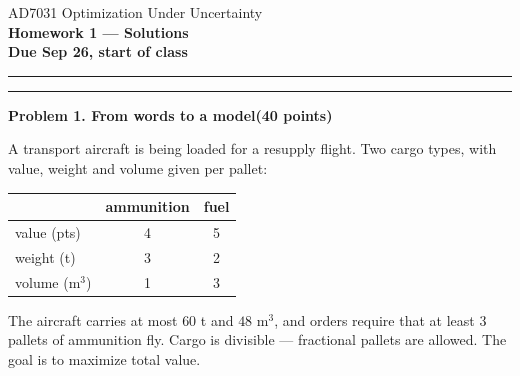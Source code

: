\documentclass[10pt]{article}
\newcommand{\problem}[2]{%
  \par\bigskip
  {\color{ruleink}\rule{\textwidth}{1pt}}\par\nobreak\vspace{3pt}
  {\large\bfseries #2}\hfill{\normalsize\bfseries(#1 points)}\par\nobreak\vspace{4pt}}
\begin{document}
\begin{center}
  {\large AD7031 Optimization Under Uncertainty}\\[3pt]
  {\Large\bfseries Homework 1 --- Solutions}\\[4pt]
  {\small \textbf{Due Sep 26, start of class}}
\end{center}
\medskip\hrule\medskip

\problem{40}{Problem 1. From words to a model}

A transport aircraft is being loaded for a resupply flight. Two cargo types, with value,
weight and volume given per pallet:

\begin{center}
\begin{tabular}{l|cc}
              & ammunition & fuel \\ \hline
 value (pts)  & 4 & 5 \\
 weight (t)   & 3 & 2 \\
 volume (m$^3$) & 1 & 3 \\
\end{tabular}
\end{center}

The aircraft carries at most $60$ t and $48$ m$^3$, and orders require that at least
$3$ pallets of ammunition fly. Cargo is divisible --- fractional pallets are allowed.
The goal is to maximize total value.
\end{document}
